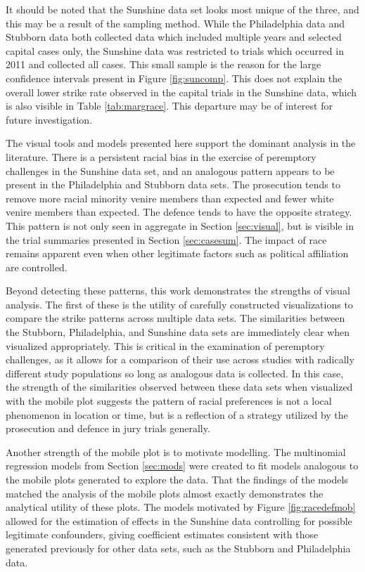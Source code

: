 \documentclass[12pt]{article}
\begin{document}
It should be noted that the Sunshine data set looks most unique of the three, and this may be a result of the sampling method. While the Philadelphia data and Stubborn data both collected data which included multiple years and selected capital cases only, the Sunshine data was restricted to trials which occurred in 2011 and collected all cases. This small sample is the reason for the large confidence intervals present in Figure \ref{fig:suncomp}. This does not explain the overall lower strike rate observed in the capital trials in the Sunshine data, which is also visible in Table \ref{tab:margrace}. This departure may be of interest for future investigation.


The visual tools and models presented here support the dominant analysis in the literature. There is a persistent racial bias in the exercise of peremptory challenges in the Sunshine data set, and an analogous pattern appears to be present in the Philadelphia and Stubborn data sets. The prosecution tends to remove more racial minority venire members than expected and fewer white venire members than expected. The defence tends to have the opposite strategy. This pattern is not only seen in aggregate in Section \ref{sec:visual}, but is visible in the trial summaries presented in Section \ref{sec:casesum}. The impact of race remains apparent even when other legitimate factors such as political affiliation are controlled.

Beyond detecting these patterns, this work demonstrates the strengths of visual analysis. The first of these is the utility of carefully constructed visualizations to compare the strike patterns across multiple data sets. The similarities between the Stubborn, Philadelphia, and Sunshine data sets are immediately clear when visualized appropriately. This is critical in the examination of peremptory challenges, as it allows for a comparison of their use across studies with radically different study populations so long as analogous data is collected. In this case, the strength of the similarities observed between these data sets when visualized with the mobile plot suggests the pattern of racial preferences is not a local phenomenon in location or time, but is a reflection of a strategy utilized by the prosecution and defence in jury trials generally.

Another strength of the mobile plot is to motivate modelling. The multinomial regression models from Section \ref{sec:mods} were created to fit models analogous to the mobile plots generated to explore the data. That the findings of the models matched the analysis of the mobile plots almost exactly demonstrates the analytical utility of these plots. The models motivated by Figure \ref{fig:racedefmob} allowed for the estimation of effects in the Sunshine data controlling for possible legitimate confounders, giving coefficient estimates consistent with those generated previously for other data sets, such as the Stubborn and Philadelphia data.
\end{document}
